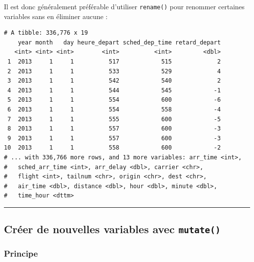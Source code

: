 \documentclass[
  a4paper,
]{article}
\newenvironment{Shaded}{\begin{snugshade}}{\end{snugshade}}
\newcommand{\DataTypeTok}[1]{\textcolor[rgb]{0.00,0.34,0.68}{#1}}
\newcommand{\KeywordTok}[1]{\textcolor[rgb]{0.12,0.11,0.11}{\textbf{#1}}}
\newcommand{\NormalTok}[1]{\textcolor[rgb]{0.12,0.11,0.11}{#1}}
\newcommand{\OperatorTok}[1]{\textcolor[rgb]{0.12,0.11,0.11}{#1}}
\newcommand{\StringTok}[1]{\textcolor[rgb]{0.75,0.01,0.01}{#1}}
\begin{document}
Il est donc généralement préférable d'utiliser \texttt{rename()} pour renommer certaines variables sans en éliminer aucune :

\begin{Shaded}
\end{Shaded}

\begin{verbatim}
# A tibble: 336,776 x 19
    year month   day heure_depart sched_dep_time retard_depart
   <int> <int> <int>        <int>          <int>         <dbl>
 1  2013     1     1          517            515             2
 2  2013     1     1          533            529             4
 3  2013     1     1          542            540             2
 4  2013     1     1          544            545            -1
 5  2013     1     1          554            600            -6
 6  2013     1     1          554            558            -4
 7  2013     1     1          555            600            -5
 8  2013     1     1          557            600            -3
 9  2013     1     1          557            600            -3
10  2013     1     1          558            600            -2
# ... with 336,766 more rows, and 13 more variables: arr_time <int>,
#   sched_arr_time <int>, arr_delay <dbl>, carrier <chr>,
#   flight <int>, tailnum <chr>, origin <chr>, dest <chr>,
#   air_time <dbl>, distance <dbl>, hour <dbl>, minute <dbl>,
#   time_hour <dttm>
\end{verbatim}

\begin{center}\rule{0.5\linewidth}{0.5pt}\end{center}

\hypertarget{mutate}{%
\subsection{\texorpdfstring{Créer de nouvelles variables avec \texttt{mutate()}}{Créer de nouvelles variables avec mutate()}}\label{mutate}}

\hypertarget{principe-1}{%
\subsubsection{Principe}\label{principe-1}}
\end{document}
